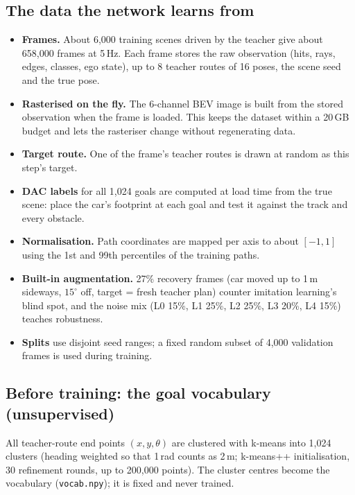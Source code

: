 \documentclass[11pt,a4paper]{article}
\newcommand{\code}[1]{\texttt{#1}}
\begin{document}
\subsection{The data the network learns from}
\begin{itemize}
  \item \textbf{Frames.} About 6{,}000 training scenes driven by the teacher give about 658{,}000 frames at
        5\,Hz. Each frame stores the raw observation (hits, rays, edges, classes, ego state), up to 8
        teacher routes of 16 poses, the scene seed and the true pose.
  \item \textbf{Rasterised on the fly.} The 6-channel BEV image is built from the stored observation when the
        frame is loaded. This keeps the dataset within a 20\,GB budget and lets the rasteriser change without
        regenerating data.
  \item \textbf{Target route.} One of the frame's teacher routes is drawn at random as this step's target.
  \item \textbf{DAC labels} for all 1{,}024 goals are computed at load time from the true scene: place the car's
        footprint at each goal and test it against the track and every obstacle.
  \item \textbf{Normalisation.} Path coordinates are mapped per axis to about $[-1,1]$ using the 1st and 99th
        percentiles of the training paths.
  \item \textbf{Built-in augmentation.} 27\% recovery frames (car moved up to 1\,m sideways, $15^\circ$ off,
        target = fresh teacher plan) counter imitation learning's blind spot, and the noise mix
        (L0 15\%, L1 25\%, L2 25\%, L3 20\%, L4 15\%) teaches robustness.
  \item \textbf{Splits} use disjoint seed ranges; a fixed random subset of 4{,}000 validation frames is used
        during training.
\end{itemize}

\subsection{Before training: the goal vocabulary (unsupervised)}
All teacher-route end points $(x,y,\theta)$ are clustered with k-means into 1{,}024 clusters (heading
weighted so that 1\,rad counts as 2\,m; k-means++ initialisation, 30 refinement rounds, up to 200{,}000
points). The cluster centres become the vocabulary (\code{vocab.npy}); it is fixed and never trained.
\end{document}
